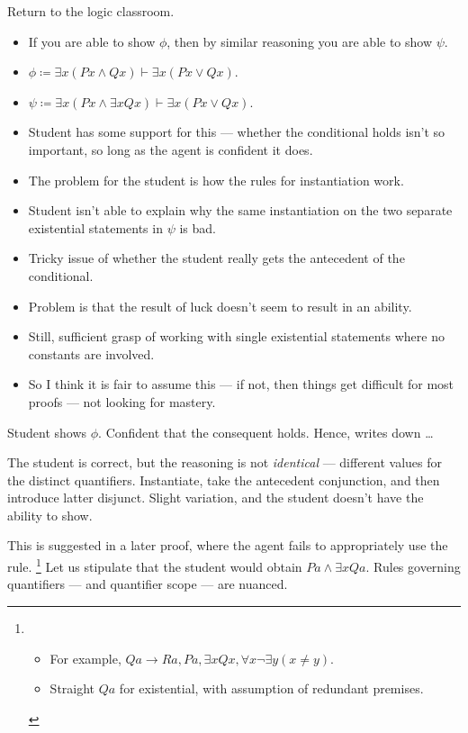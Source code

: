 \documentclass[10pt]{article}
\begin{document}
\begin{note}
  Return to the logic classroom.

  \begin{itemize}
  \item If you are able to show \(\phi\), then by similar reasoning you are able to show \(\psi\).
  \item \(\phi \coloneq \exists x(Px \land Qx) \vdash \exists x(Px \lor Qx)\).
  \item \(\psi \coloneq \exists x (Px \land \exists x Qx) \vdash \exists x(Px \lor Qx)\).
  \item Student has some support for this --- whether the conditional holds isn't so important, so long as the agent is confident it does.
  \item The problem for the student is how the rules for instantiation work.
  \item Student isn't able to explain why the same instantiation on the two separate existential statements in \(\psi\) is bad.
  \item Tricky issue of whether the student really gets the antecedent of the conditional.
  \item Problem is that the result of luck doesn't seem to result in an ability.
  \item Still, sufficient grasp of working with single existential statements where no constants are involved.
  \item So I think it is fair to assume this --- if not, then things get difficult for most proofs --- not looking for mastery.
  \end{itemize}

  Student shows \(\phi\).
  Confident that the consequent holds.
  Hence, writes down \dots

  The student is correct, but the reasoning is not \emph{identical} --- different values for the distinct quantifiers.
  Instantiate, take the antecedent conjunction, and then introduce latter disjunct.
  Slight variation, and the student doesn't have the ability to show.

  This is suggested in a later proof, where the agent fails to appropriately use the rule.\nolinebreak
  \footnote{
    \begin{itemize}
    \item For example, \(Qa \rightarrow Ra, Pa, \exists x Qx, \forall x \lnot \exists y (x \ne y)\).
    \item Straight \(Qa\) for existential, with assumption of redundant premises.
    \end{itemize}
  }
  Let us stipulate that the student would obtain \(Pa \land \exists x Qa\).
  Rules governing quantifiers --- and quantifier scope --- are nuanced.


\end{note}
\end{document}
